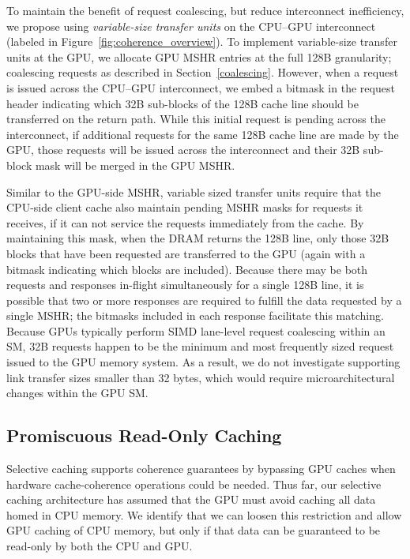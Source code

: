 To maintain the benefit of request coalescing, but reduce interconnect
inefficiency, we propose using \textit{variable-size transfer units} on the 
CPU--GPU interconnect (labeled  in Figure~\ref{fig:coherence_overview}).  
To implement variable-size transfer units at the GPU, we allocate GPU MSHR entries at the full
128B granularity; coalescing requests as described in Section~\ref{coalescing}.  However, 
when a request is issued across the CPU--GPU interconnect, we embed a bitmask in the 
request header indicating which 32B sub-blocks of the 128B cache line should be transferred on the return path.
While this initial request is pending across the interconnect, if additional requests
for the same 128B cache line are made by the GPU, those requests will be issued across the interconnect
and their 32B sub-block mask will be merged in the GPU MSHR.  

Similar to the GPU-side MSHR, variable sized transfer units require that the CPU-side client cache also maintain pending MSHR
masks for requests it receives, if it can not service the requests immediately from the
cache.  By maintaining this mask, when the DRAM returns the 128B line, only those
32B blocks that have been requested are transferred to the GPU (again with a bitmask indicating
which blocks are included).  Because there may be
both requests and responses in-flight simultaneously for a single 128B line, it is possible
that two or more responses are required to fulfill the data requested by a single MSHR; the bitmasks
included in each response facilitate this matching.
Because GPUs typically perform SIMD lane-level request coalescing within an SM, 32B requests happen 
to be the minimum and most frequently sized request issued to the GPU memory system.  As a result, we do 
not investigate supporting link transfer sizes smaller than 32 bytes, which would require microarchitectural
changes within the GPU SM.

\subsection{Promiscuous Read-Only Caching}
\label{readonly}

Selective caching supports coherence guarantees by bypassing GPU caches when
hardware cache-coherence operations could be needed.  Thus far, our selective caching architecture
has assumed that the GPU must avoid caching all data homed in CPU memory.  We identify
that we can loosen this restriction and allow GPU caching of CPU memory, but only
if that data can be guaranteed to be read-only by both the CPU and GPU.

